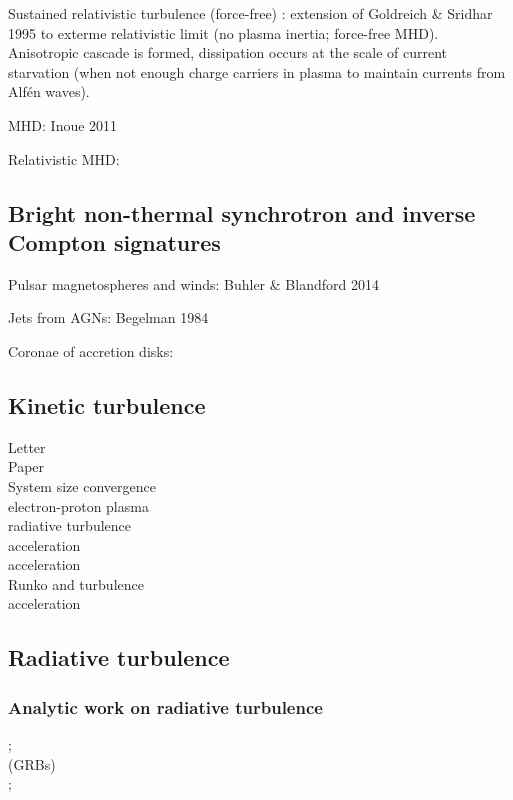\documentclass[usenatbib,twocolumn]{aastex63}
\begin{document}
Sustained relativistic turbulence (force-free)
\citep{Thompson_1998}: extension of Goldreich \& Sridhar 1995 to exterme relativistic limit (no plasma inertia; force-free MHD).
Anisotropic cascade is formed, dissipation occurs at the scale of current starvation (when not enough charge carriers in plasma to maintain currents from Alf\'en waves).

MHD:
\citep{Cho_2005}
Inoue 2011
\citep{Cho_2014}
\citep{Zrake_2016}

Relativistic MHD:
\citep{Zrake_2012}
\citep{Zrake_2014}

\subsection{Bright non-thermal synchrotron and inverse Compton signatures}
Pulsar magnetospheres and winds:
Buhler \& Blandford 2014

Jets from AGNs: Begelman 1984

Coronae of accretion disks:
\citep{Yuan_2014}


\subsection{Kinetic turbulence}

\citep{Zhdankin_2017a} Letter\\
\citep{Zhdankin_2017b} Paper\\
\citep{Zhdankin_2018} System size convergence\\
\citep{Zhdankin_2019a} electron-proton plasma\\
\citep{Zhdankin_2019b} radiative turbulence\\
\citep{Comisso_2018} acceleration\\
\citep{Wong_2019} acceleration\\
\citep{Nattila_2019} Runko and turbulence\\
\citep{Comisso_2019} acceleration\\

\subsection{Radiative turbulence}

\subsubsection{Analytic work on radiative turbulence}
\citep{Uzdensky_2018}; \\
\citep{Zrake_2018} (GRBs) \\
\citep{Sobacchi_2019}; \\
 
\end{document}
